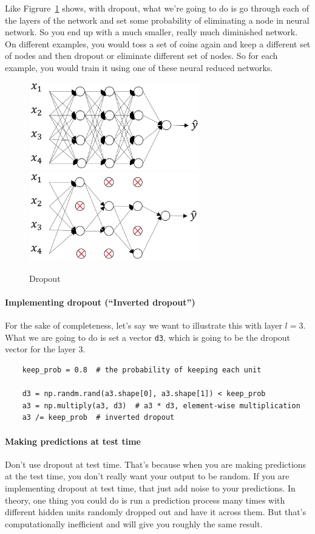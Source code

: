 \documentclass[UTF8]{article}
\begin{document}
Like Figrure~\ref{fig:dropout} shows, with dropout, what we're going to do is go through each of
the layers of the network and set some probability of eliminating a node in neural network. So you
end up with a much smaller, really much diminished network. On different examples, you would toss a
set of coins again and keep a different set of nodes and then dropout or eliminate different set of
nodes. So for each example, you would train it using one of these neural reduced networks.

\begin{figure}[htb]
    \centering
    \includegraphics[width=20em]{figures/dropout-orig}
    \includegraphics[width=20em]{figures/dropout-zero-out}
    \caption{Dropout}
    \label{fig:dropout}
\end{figure}

\paragraph{Implementing dropout (``Inverted dropout'')}
For the sake of completeness, let's say we want to illustrate this with layer $l=3$. What we are
going to do is set a vector \texttt{d3}, which is going to be the dropout vector for the
layer 3.
\begin{verbatim}
    keep_prob = 0.8  # the probability of keeping each unit

    d3 = np.randm.rand(a3.shape[0], a3.shape[1]) < keep_prob
    a3 = np.multiply(a3, d3)  # a3 * d3, element-wise multiplication
    a3 /= keep_prob  # inverted dropout
\end{verbatim}

\paragraph{Making predictions at test time}
Don't use dropout at test time. That's because when you are making predictions at the test time,
you don't really want your output to be random. If you are implementing dropout at test time, that
just add noise to your predictions. In theory, one thing you could do is run a prediction process
many times with different hidden units randomly dropped out and have it across them. But that's
computationally inefficient and will give you roughly the same result.
\end{document}
